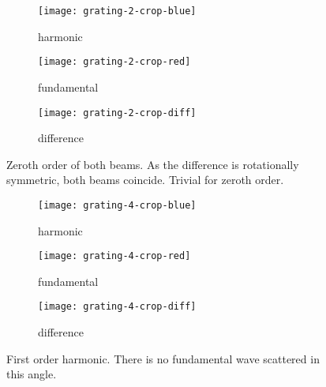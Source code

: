 \documentclass[11pt, english, fleqn, DIV=15, headinclude, BCOR=2cm]{scrreprt}
\begin{document}
\begin{figure}
    \centering
    \begin{subfigure}[c]{0.3\linewidth}
        \centering
        \texttt{[image: grating-2-crop-blue]}
        \caption{%
            harmonic
            }
    \end{subfigure}
    \hfill
    \begin{subfigure}[c]{0.3\linewidth}
        \centering
        \texttt{[image: grating-2-crop-red]}
        \caption{%
            fundamental
            }
    \end{subfigure}
    \hfill
    \begin{subfigure}[c]{0.3\linewidth}
        \centering
        \texttt{[image: grating-2-crop-diff]}
        \caption{%
            difference
            }
    \end{subfigure}
    \caption{%
        Zeroth order of both beams. As the difference is rotationally
        symmetric, both beams coincide. Trivial for zeroth order.
        }
    \label{fig:grating-2}
\end{figure}

\begin{figure}
    \centering
    \begin{subfigure}[c]{0.3\linewidth}
        \centering
        \texttt{[image: grating-4-crop-blue]}
        \caption{%
            harmonic
            }
    \end{subfigure}
    \hfill
    \begin{subfigure}[c]{0.3\linewidth}
        \centering
        \texttt{[image: grating-4-crop-red]}
        \caption{%
            fundamental
            }
    \end{subfigure}
    \hfill
    \begin{subfigure}[c]{0.3\linewidth}
        \centering
        \texttt{[image: grating-4-crop-diff]}
        \caption{%
            difference
            }
    \end{subfigure}
    \caption{%
        First order harmonic. There is no fundamental wave scattered in this
        angle.
        }
    \label{fig:grating-4}
\end{figure}
\end{document}
